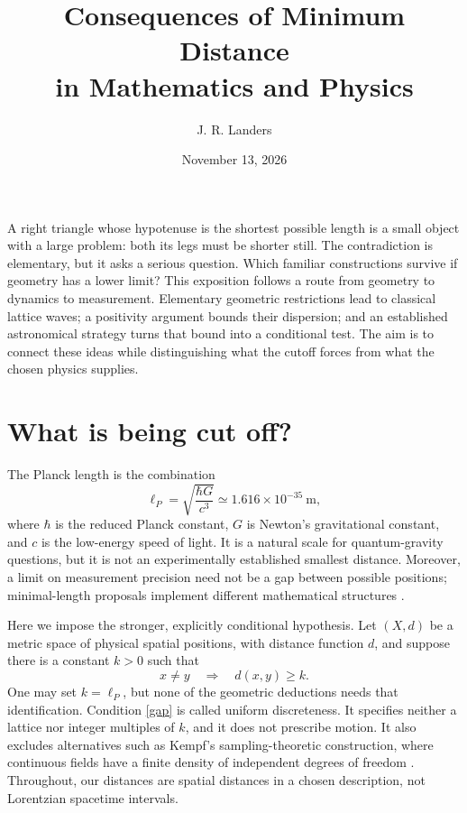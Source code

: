 \documentclass[11pt]{article}
\title{\vspace{-1.5em}Consequences of Minimum Distance\\in Mathematics and Physics}
\author{J. R. Landers}
\date{November 13, 2026}
\begin{document}
\maketitle
\vspace{-1.2em}

A right triangle whose hypotenuse is the shortest possible length is a small object with a large problem: both its legs must be shorter still. The contradiction is elementary, but it asks a serious question. Which familiar constructions survive if geometry has a lower limit? This exposition follows a route from geometry to dynamics to measurement. Elementary geometric restrictions lead to classical lattice waves; a positivity argument bounds their dispersion; and an established astronomical strategy turns that bound into a conditional test. The aim is to connect these ideas while distinguishing what the cutoff forces from what the chosen physics supplies.

\section{What is being cut off?}
The Planck length is the combination
\begin{equation}
\ell_P=\sqrt{\frac{\hbar G}{c^3}}\simeq1.616\times10^{-35}\ \mathrm{m},
\end{equation}
where $\hbar$ is the reduced Planck constant, $G$ is Newton's gravitational constant, and $c$ is the low-energy speed of light. It is a natural scale for quantum-gravity questions, but it is not an experimentally established smallest distance. Moreover, a limit on measurement precision need not be a gap between possible positions; minimal-length proposals implement different mathematical structures \cite{hossenfelder}.

Here we impose the stronger, explicitly conditional hypothesis. Let $(X,d)$ be a metric space of physical spatial positions, with distance function $d$, and suppose there is a constant $k>0$ such that
\begin{equation}\label{gap}
x\ne y\quad\Longrightarrow\quad d(x,y)\geq k.
\end{equation}
One may set $k=\ell_P$, but none of the geometric deductions needs that identification. Condition \eqref{gap} is called uniform discreteness. It specifies neither a lattice nor integer multiples of $k$, and it does not prescribe motion. It also excludes alternatives such as Kempf's sampling-theoretic construction, where continuous fields have a finite density of independent degrees of freedom \cite{kempf}. Throughout, our distances are spatial distances in a chosen description, not Lorentzian spacetime intervals.
\end{document}
